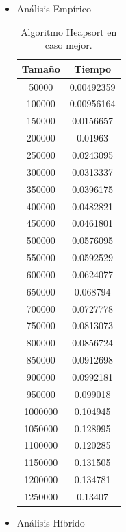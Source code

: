 \documentclass[a4paper,12pt,twoside]{article} %
\begin{document}
	\begin{itemize}
	\item Análisis Empírico
	
	\begin{table}[h]
	\begin{center}
		\begin{tabular}{|c|c|}
		\hline
		Tamaño & Tiempo \\
		\hline
		50000 & 0.00492359 \\ 
		100000 & 0.00956164 \\
		150000 & 0.0156657 \\ 
		200000 & 0.01963 \\ 
		250000 & 0.0243095 \\ 
		300000 & 0.0313337 \\ 
		350000 & 0.0396175 \\ 
		400000 & 0.0482821 \\ 
		450000 & 0.0461801 \\ 
		500000 & 0.0576095 \\ 
		550000 & 0.0592529 \\ 
		600000 & 0.0624077 \\ 
		650000 & 0.068794 \\ 
		700000 & 0.0727778 \\ 
		750000 & 0.0813073 \\ 
		800000 & 0.0856724 \\ 
		850000 & 0.0912698 \\ 
		900000 & 0.0992181 \\ 
		950000 & 0.099018 \\ 
		1000000 & 0.104945 \\ 
		1050000 & 0.128995 \\ 
		1100000 & 0.120285 \\ 
		1150000 & 0.131505 \\ 
		1200000 & 0.134781 \\ 
		1250000 & 0.13407 \\
		\hline
		\end{tabular}
	\end{center}
	\caption{Algoritmo Heapsort en caso mejor.}
\end{table}
\newpage
	
	\item Análisis Híbrido
	
\begin{figure}[h]
  \begin{center}
  

\end{center}
\end{figure}
\end{itemize}
\end{document}

